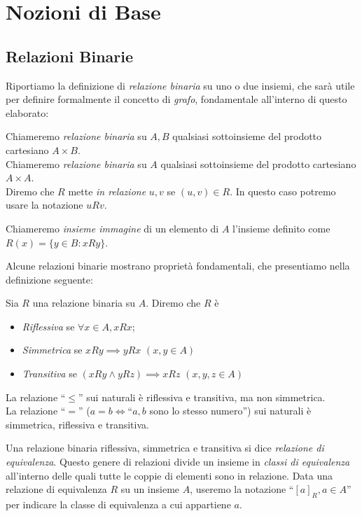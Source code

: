 \section{Nozioni di Base}
\label{sec:base}

\subsection{Relazioni Binarie}
Riportiamo la definizione di \emph{relazione binaria} su uno o due insiemi, che sarà utile per definire formalmente il concetto di \emph{grafo}, fondamentale all'interno di questo elaborato:
\begin{definition}
    Chiameremo \emph{relazione binaria} su $A,B$ qualsiasi sottoinsieme del prodotto cartesiano $A \times B$.\\
    Chiameremo \emph{relazione binaria} su $A$ qualsiasi sottoinsieme del prodotto cartesiano $A \times A$.\\
	Diremo che $R$ mette \emph{in relazione} $u,v$ se $(u,v) \in R$. In questo caso potremo usare la notazione $u R v$.
\end{definition}
\begin{definition}
    Chiameremo \emph{insieme immagine} di un elemento di $A$ l'insieme definito come $R(x) = \{y \in B : x R y\}$.
\end{definition}
Alcune relazioni binarie mostrano proprietà fondamentali, che presentiamo nella definizione seguente:
\begin{definition}
    Sia $R$ una relazione binaria su $A$. Diremo che $R$ è
    \begin{itemize}
        \item \emph{Riflessiva} se $\forall x \in A, x R x$;
        \item \emph{Simmetrica} se $x R y \implies y R x \,\,(x,y \in A)$
        \item \emph{Transitiva} se $(x R y \land y R z) \implies x R z \,\,(x,y,z \in A)$
    \end{itemize}
\end{definition}
\begin{example}
    La relazione ``$\leq$'' sui naturali è riflessiva e transitiva, ma non simmetrica.\\
    La relazione ``$=$'' ($a = b \iff $``$a,b$ sono lo stesso numero'') sui naturali è simmetrica, riflessiva e transitiva.
\end{example}
\begin{definition}
    Una relazione binaria riflessiva, simmetrica e transitiva si dice \emph{relazione di equivalenza}. Questo genere di relazioni divide un insieme in \emph{classi di equivalenza} all'interno delle quali tutte le coppie di elementi sono in relazione. Data una relazione di equivalenza $R$ su un insieme $A$, useremo la notazione ``$[a]_R, a \in A$'' per indicare la classe di equivalenza a cui appartiene $a$.
\end{definition}
